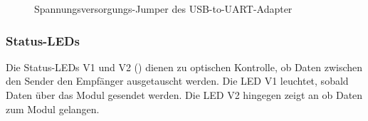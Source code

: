 \begin{figure}[H]
    \centering
    \qquad
    \qquad
    \caption[Spannungsversorgungs-Jumper des USB-to-UART-Adapter]{Spannungsversorgungs-Jumper des \gls{USB-to-UART}-Adapter}
    \label{fig:usbtouart-spannung3}
\end{figure}

\subsubsection{Status-LEDs}
Die Status-LEDs V1 und V2 () dienen zu optischen Kontrolle, ob Daten zwischen den Sender den Empfänger ausgetauscht werden. Die LED V1 leuchtet, sobald Daten über das Modul gesendet werden. Die LED V2 hingegen zeigt an ob Daten zum Modul gelangen.

